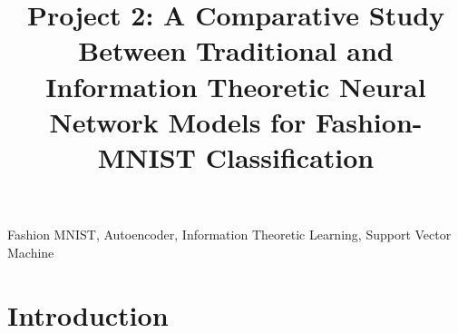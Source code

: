 \documentclass[conference]{IEEEtran}
\begin{document}
\title{Project 2: A Comparative Study Between Traditional and Information Theoretic Neural Network Models for Fashion-MNIST Classification}
\author{

}

\maketitle


\begin{abstract}
	
\end{abstract} 

\begin{IEEEkeywords}
Fashion MNIST, Autoencoder, Information Theoretic Learning, Support Vector Machine
\end{IEEEkeywords}


\section{Introduction} 
\end{document}
